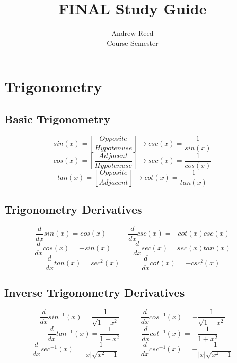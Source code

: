 \documentclass[12pt]{article}
\begin{document}
 
 
\title{FINAL Study Guide}%
\author{Andrew Reed\\ %
Course-Semester} %
 
\maketitle

\tableofcontents

\pagebreak

\section{Trigonometry}

\subsection{Basic Trigonometry}
\[
	sin(x) = \left [ \frac{Opposite}{Hypotenuse} \right ] \rightarrow csc(x) = \frac{1}{sin(x)}
\]
\[
	cos(x) = \left [ \frac{Adjacent}{Hypotenuse} \right ]  \rightarrow sec(x) = \frac{1}{cos(x)}
\]
\[
	tan(x)= \left [ \frac{Opposite}{Adjacent} \right ] \rightarrow cot(x) = \frac{1}{tan(x)}
\]

\subsection{Trigonometry Derivatives}
\[
	\frac{d}{dx} sin(x) = cos(x) \quad \quad \quad \frac{d}{dx} csc(x) = -cot(x)csc(x)
\]
\[
	\frac{d}{dx} cos(x) = -sin(x) \quad \quad \quad \frac{d}{dx} sec(x) = sec(x)tan(x)
\]
\[
	\frac{d}{dx} tan(x) = sec^{2}(x) \quad \quad \quad \frac{d}{dx} cot(x) = -csc^{2}(x)
\]

\subsection{Inverse Trigonometry Derivatives}
\[
	\frac{d}{dx}sin^{-1}(x) = \frac{1}{\sqrt{1-x^{2}}} \quad \quad \quad \frac{d}{dx}cos^{-1}(x) = - \frac{1}{\sqrt{1-x^{2}}}
\]
\[
	\frac{d}{dx}tan^{-1}(x) = \frac{1}{1 + x^{2}} \quad \quad \quad \frac{d}{dx}cot^{-1}(x) = - \frac{1}{1 + x^{2}}
\]
\[
	\frac{d}{dx}sec^{-1}(x) = \frac{1}{\left | x \right | \sqrt{x^{2} - 1}} \quad \quad \quad \frac{d}{dx}csc^{-1}(x) = - \frac{1}{\left | x \right | \sqrt{x^{2} - 1}} 
\]
\pagebreak
\end{document}
